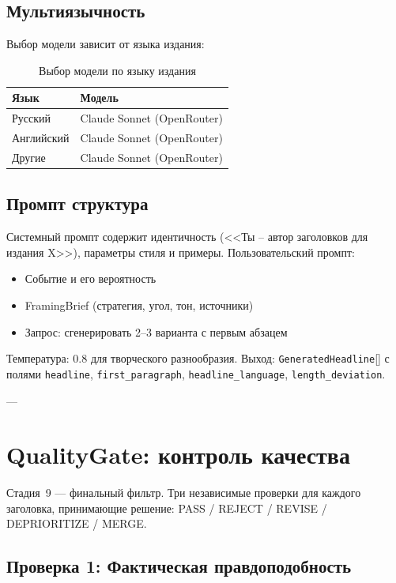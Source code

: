 \subsection{Мультиязычность}

Выбор модели зависит от языка издания:
\begin{table}[h]
  \centering
  \caption{Выбор модели по языку издания}
  \label{tab:language-models}
  \begin{tabular}{|l|l|}
    \hline
    \textbf{Язык} & \textbf{Модель} \\
    \hline
    Русский & Claude Sonnet (OpenRouter) \\
    \hline
    Английский & Claude Sonnet (OpenRouter) \\
    \hline
    Другие & Claude Sonnet (OpenRouter) \\
    \hline
  \end{tabular}
\end{table}

\subsection{Промпт структура}

Системный промпт содержит идентичность (<<Ты -- автор заголовков для издания X>>), параметры стиля и примеры. Пользовательский промпт:
\begin{itemize}
  \item Событие и его вероятность
  \item FramingBrief (стратегия, угол, тон, источники)
  \item Запрос: сгенерировать 2--3 варианта с первым абзацем
\end{itemize}

Температура: 0.8 для творческого разнообразия. Выход: \verb|GeneratedHeadline|[] с полями \verb|headline|, \verb|first_paragraph|, \verb|headline_language|, \verb|length_deviation|.

---

\section{QualityGate: контроль качества}
\label{sec:quality-gate}

Стадия~9 — финальный фильтр. Три независимые проверки для каждого заголовка, принимающие решение: PASS / REJECT / REVISE / DEPRIORITIZE / MERGE.

\subsection{Проверка 1: Фактическая правдоподобность}

